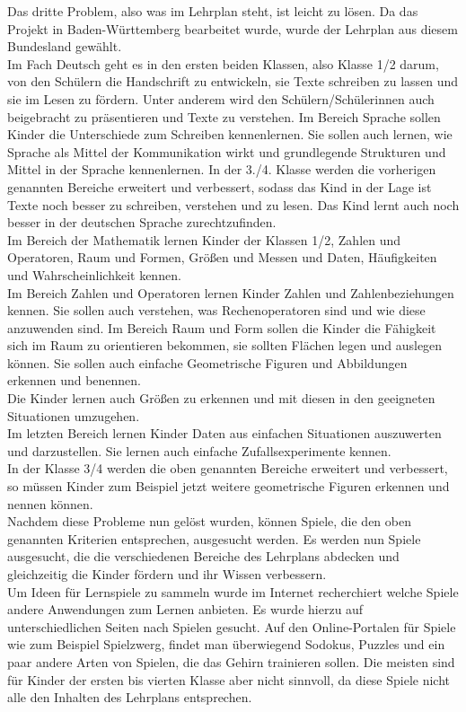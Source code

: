 Das dritte Problem, also was im Lehrplan steht, ist leicht zu lösen. Da das Projekt in Baden-Württemberg bearbeitet wurde, wurde der Lehrplan aus diesem Bundesland gewählt.\\
Im Fach Deutsch geht es in den ersten beiden Klassen, also Klasse 1/2 darum, von den Schülern die Handschrift zu entwickeln, sie Texte schreiben zu lassen und sie im Lesen zu fördern. Unter anderem wird den Schülern/Schülerinnen auch beigebracht zu präsentieren und Texte zu verstehen. Im Bereich Sprache sollen Kinder die Unterschiede zum Schreiben kennenlernen. Sie sollen auch lernen, wie Sprache als Mittel der Kommunikation wirkt und grundlegende Strukturen und Mittel in der Sprache kennenlernen. In der 3./4. Klasse werden die vorherigen genannten Bereiche erweitert und verbessert, sodass das Kind in der Lage ist Texte noch besser zu schreiben, verstehen und zu lesen. Das Kind lernt auch noch besser in der deutschen Sprache zurechtzufinden\autocite{German}.\\
Im Bereich der Mathematik lernen Kinder der Klassen 1/2, Zahlen und Operatoren, Raum und Formen, Größen und Messen und Daten, Häufigkeiten und Wahrscheinlichkeit kennen.\\
Im Bereich Zahlen und Operatoren lernen Kinder Zahlen und Zahlenbeziehungen kennen. Sie sollen auch verstehen, was Rechenoperatoren sind und wie diese anzuwenden sind. Im Bereich Raum und Form sollen die Kinder die Fähigkeit sich im Raum zu orientieren bekommen, sie sollten Flächen legen und auslegen können. Sie sollen auch einfache Geometrische Figuren und Abbildungen erkennen und benennen.\\
Die Kinder lernen auch Größen zu erkennen und mit diesen in den geeigneten Situationen umzugehen.\\
Im letzten Bereich lernen Kinder Daten aus einfachen Situationen auszuwerten und darzustellen. Sie lernen auch einfache Zufallsexperimente kennen.
\\
In der Klasse 3/4 werden die oben genannten Bereiche erweitert und verbessert, so müssen Kinder zum Beispiel jetzt weitere geometrische Figuren erkennen und nennen können\autocite{Math}.
\\
Nachdem diese Probleme nun gelöst wurden, können Spiele, die den oben genannten Kriterien entsprechen, ausgesucht werden. Es werden nun Spiele ausgesucht, die die verschiedenen Bereiche des Lehrplans abdecken und gleichzeitig die Kinder fördern und ihr Wissen verbessern.\\
Um Ideen für Lernspiele zu sammeln wurde im Internet recherchiert welche Spiele andere Anwendungen zum Lernen anbieten. Es wurde hierzu auf unterschiedlichen Seiten nach Spielen gesucht. Auf den Online-Portalen für Spiele wie zum Beispiel Spielzwerg, findet man überwiegend Sodokus, Puzzles und ein paar andere Arten von Spielen, die das Gehirn trainieren sollen. Die meisten sind für Kinder der ersten bis vierten Klasse aber nicht sinnvoll, da diese Spiele nicht alle den Inhalten des Lehrplans entsprechen.\\
